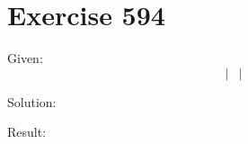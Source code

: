 \documentclass[a4paper, 10pt]{scrartcl}
\begin{document}
\section{Exercise 594}

Given:
\[
\left|
    \begin{array}{ccc}
    \end{array}
\right|
\]

Solution:

Result:
\end{document}
